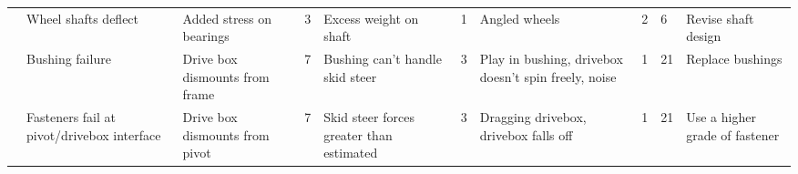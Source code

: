 \begin{landscape}
\begin{minipage}{\linewidth}
\begin{tabular}{| p{1cm}|p{3cm}p{3.5cm}p{0.5cm}p{3cm}p{0.5cm}p{3.5cm}p{0.5cm}p{0.5cm}p{3cm} |}
 & Wheel shafts deflect & Added stress on bearings & 3 & Excess weight on shaft & 1 & Angled wheels & 2 & 6 & Revise shaft design \\
 & Bushing failure & Drive box dismounts from frame & 7 & Bushing can't handle skid steer & 3 & Play in bushing, drivebox doesn't spin freely, noise & 1 & 21 & Replace bushings \\
 & Fasteners fail at pivot/drivebox interface& Drive box dismounts from pivot & 7 & Skid steer forces greater than estimated & 3 & Dragging drivebox, drivebox falls off & 1 & 21 & Use a higher grade of fastener \\ \hline
 \end{tabular}
 \label{tab:dfmea}
 \end{minipage}
 \end{landscape}
